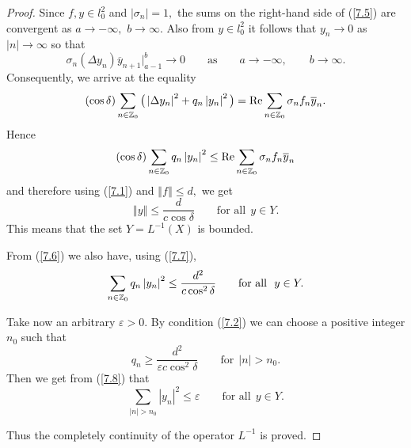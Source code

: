 \documentclass[11pt]{article}
\numberwithin{equation}{section}
\begin{document}
\begin{proof}
Since $f,y\in l_{0}^{2}$ and $\left\vert \sigma _{n}\right\vert =1,$ the
sums on the right-hand side of (\ref{7.5}) are convergent as $a\rightarrow
-\infty ,$ $b\rightarrow \infty .$ Also from $y\in l_{0}^{2}$ it follows
that $y_{n}\rightarrow 0$ as $\left\vert n\right\vert \rightarrow \infty $
so that%
\[
\sigma _{n}(\Delta y_{n})\overline{y}_{n+1}\big|_{a-1}^{b}\rightarrow 0\qquad \text{as} \qquad a\rightarrow -\infty ,\qquad b\rightarrow \infty .
\]
Consequently, we arrive at the equality%
\[
(\cos \delta )\sum_{n\in
\mathbb{Z}
_{0}}\big( \left\vert \Delta y_{n}\right\vert ^{2}+q_{n}\left\vert
y_{n}\right\vert ^{2}\big) ={\rm Re}\sum_{n\in
\mathbb{Z}
_{0}}\sigma _{n}f_{n}\overline{y}_{n}.
\]%
Hence%
\begin{equation}
(\cos \delta )\sum_{n\in
\mathbb{Z}
_{0}}q_{n}\left\vert y_{n}\right\vert ^{2}\leq {\rm Re}\sum_{n\in
\mathbb{Z}
_{0}}\sigma _{n}f_{n}\overline{y}_{n}  \label{7.6}
\end{equation}%
and therefore using (\ref{7.1}) and $\left\Vert f\right\Vert \leq d,$ we get{\samepage
\begin{equation}
\left\Vert y\right\Vert \leq \frac{d}{c\cos \delta }\qquad \text{for all} \ \
y\in Y.  \label{7.7}
\end{equation}%
This means that the set $Y=L^{-1}(X)$ is bounded.}

From (\ref{7.6}) we also have, using (\ref{7.7}),%
\begin{equation}
\sum_{n\in \mathbf{%
\mathbb{Z}
}_{0}}q_{n}\left\vert y_{n}\right\vert ^{2}\leq \frac{d^{2}}{c\cos
^{2}\delta } \qquad \text{for all} \ \ y\in Y.  \label{7.8}
\end{equation}

Take now an arbitrary $\varepsilon >0$. By condition (\ref{7.2}) we can
choose a positive integer $n_{0}$ such that
\[
q_{n}\geq \frac{d^{2}}{\varepsilon c\cos ^{2}\delta } \qquad \text{for} \ \
\left\vert n\right\vert >n_{0}.
\]%
Then we get from (\ref{7.8}) that
\[
\sum_{\left\vert n\right\vert >n_{0}}\left\vert y_{n}\right\vert ^{2}\leq
\varepsilon \qquad \text{for all} \ \ y\in Y.
\]

Thus the completely continuity of the operator $L^{-1}$ is proved.
\end{proof}
\end{document}
